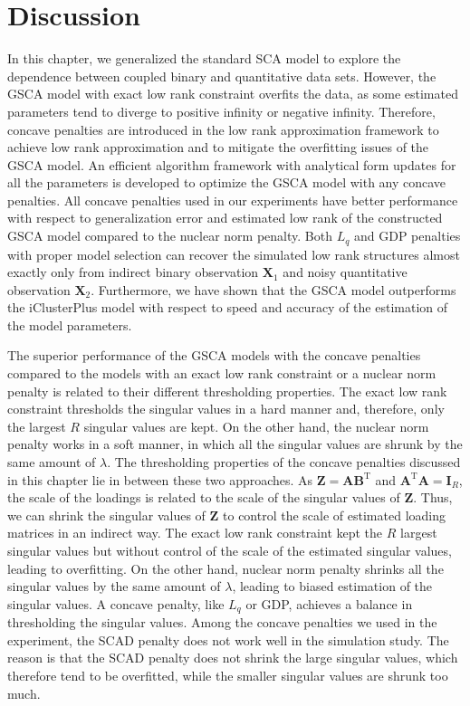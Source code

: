 \section{Discussion}  \label{section:4.6}
In this chapter, we generalized the standard SCA model to explore the dependence between coupled binary and quantitative data sets. However, the GSCA model with exact low rank constraint overfits the data, as some estimated parameters tend to diverge to positive infinity or negative infinity. Therefore, concave penalties are introduced in the low rank approximation framework to achieve low rank approximation and to mitigate the overfitting issues of the GSCA model. An efficient algorithm framework with analytical form updates for all the parameters is developed to optimize the GSCA model with any concave penalties. All concave penalties used in our experiments have better performance with respect to generalization error and estimated low rank of the constructed GSCA model compared to the nuclear norm penalty. Both $L_{q}$ and GDP penalties with proper model selection can recover the simulated low rank structures almost exactly only from indirect binary observation $\mathbf{X}_1$ and noisy quantitative observation $\mathbf{X}_2$. Furthermore, we have shown that the GSCA model outperforms the iClusterPlus model with respect to speed and accuracy of the estimation of the model parameters.

The superior performance of the GSCA models with the concave penalties compared to the models with an exact low rank constraint or a nuclear norm penalty is related to their different thresholding properties. The exact low rank constraint thresholds the singular values in a hard manner and, therefore, only the largest $R$ singular values are kept. On the other hand, the nuclear norm penalty works in a soft manner, in which all the singular values are shrunk by the same amount of $\lambda$. The thresholding properties of the concave penalties discussed in this chapter lie in between these two approaches. As $\mathbf{Z}=\mathbf{A}\mathbf{B}^{\text{T}}$ and $\mathbf{A}^{\text{T}}\mathbf{A}= \mathbf{I}_R$, the scale of the loadings is related to the scale of the singular values of $\mathbf{Z}$. Thus, we can shrink the singular values of $\mathbf{Z}$ to control the scale of estimated loading matrices in an indirect way. The exact low rank constraint kept the $R$ largest singular values but without control of the scale of the estimated singular values, leading to overfitting. On the other hand, nuclear norm penalty shrinks all the singular values by the same amount of $\lambda$, leading to biased estimation of the singular values. A concave penalty, like $L_q$ or GDP, achieves a balance in thresholding the singular values. Among the concave penalties we used in the experiment, the SCAD penalty does not work well in the simulation study. The reason is that the SCAD penalty does not shrink the large singular values, which therefore tend to be overfitted, while the smaller singular values are shrunk too much.

